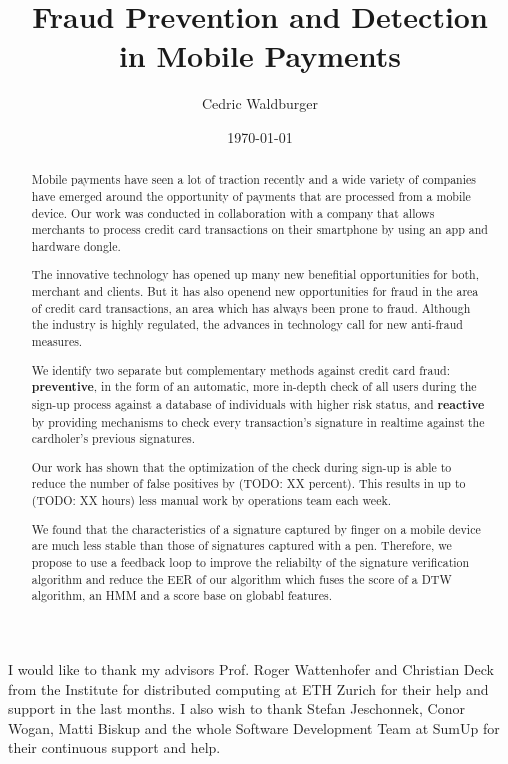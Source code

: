 \documentclass[a4paper, oneside]{csthesis}
\title{Fraud Prevention and Detection\\[5pt] in Mobile Payments}
\author{Cedric Waldburger}
\institute{Distributed Computing Group \\[2pt]
Computer Engineering and Networks Laboratory \\[2pt]
ETH Zurich}
\date{\today}
\begin{document}
\frontmatter
\maketitle %

\cleardoublepage

\begin{acknowledgements}

  I would like to thank my advisors Prof. Roger Wattenhofer and Christian Deck from the Institute for distributed computing at ETH Zurich for their help and support in the last months. I also wish to thank Stefan Jeschonnek, Conor Wogan, Matti Biskup and the whole Software Development Team at SumUp for their continuous support and help.

\end{acknowledgements}


\begin{abstract}
    Mobile payments have seen a lot of traction recently and a wide variety of companies have emerged around the opportunity of payments that are processed from a mobile device. Our work was conducted in collaboration with a company that allows merchants to process credit card transactions on their smartphone by using an app and hardware dongle.

    The innovative technology has opened up many new benefitial opportunities for both, merchant and clients. But it has also openend new opportunities for fraud in the area of credit card transactions, an area which has always been prone to fraud. Although the industry is highly regulated, the advances in technology call for new anti-fraud measures.

    We identify two  separate but complementary methods against credit card fraud: \textbf{preventive}, in the form of an automatic, more in-depth check of all users during the sign-up process against a database of individuals with higher risk status, and \textbf{reactive} by providing mechanisms to check every transaction's signature in realtime against the cardholer's previous signatures.

    Our work has shown that the optimization of the check during sign-up is able to reduce the number of false positives by (TODO: XX percent). This results in up to (TODO: XX hours) less manual work by operations team each week.

    We found that the characteristics of a signature captured by finger on a mobile device are much less stable than those of signatures captured with a pen. Therefore, we propose to use a feedback loop to improve the reliabilty of the signature verification algorithm and reduce the EER of our algorithm which fuses the score of a DTW algorithm, an HMM and a score base on globabl features.

\end{abstract}
\end{document}
